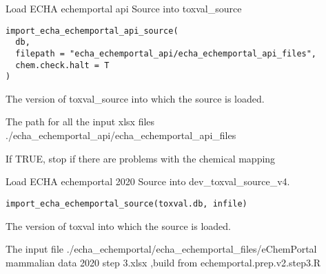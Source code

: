 \documentclass[letterpaper]{book}
\begin{document}
%
\begin{Description}\relax
Load ECHA echemportal api Source into toxval\_source
\end{Description}
%
\begin{Usage}
\begin{verbatim}
import_echa_echemportal_api_source(
  db,
  filepath = "echa_echemportal_api/echa_echemportal_api_files",
  chem.check.halt = T
)
\end{verbatim}
\end{Usage}
%
\begin{Arguments}
\begin{ldescription}
\item[\code{db}] The version of toxval\_source into which the source is loaded.

\item[\code{filepath}] The path for all the input xlsx files ./echa\_echemportal\_api/echa\_echemportal\_api\_files

\item[\code{chem.check.halt}] If TRUE, stop if there are problems with the chemical mapping
\end{ldescription}
\end{Arguments}
%
\begin{Description}\relax
Load ECHA echemportal 2020 Source into dev\_toxval\_source\_v4.
\end{Description}
%
\begin{Usage}
\begin{verbatim}
import_echa_echemportal_source(toxval.db, infile)
\end{verbatim}
\end{Usage}
%
\begin{Arguments}
\begin{ldescription}
\item[\code{toxval.db}] The version of toxval into which the source is loaded.

\item[\code{infile}] The input file ./echa\_echemportal/echa\_echemportal\_files/eChemPortal mammalian data 2020 step 3.xlsx ,build from echemportal.prep.v2.step3.R
\end{ldescription}
\end{Arguments}
\end{document}
